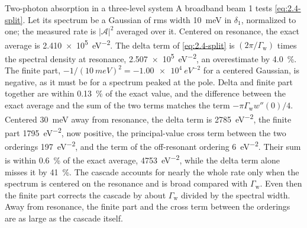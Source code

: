 \begin{workedexample}{Two-photon absorption in a three-level system}
A broadband beam 1 tests \cref{eq:2.4-split}. Let its spectrum be a Gaussian of rms width \SI{10}{meV} in $\delta_1$, normalized to one; the measured rate is $|\mathcal{A}|^2$ averaged over it. Centered on resonance, the exact average is \SI{2.410e5}{eV^{-2}}. The delta term of \cref{eq:2.4-split} is $(2\pi/\varGamma_{\mathrm{w}})$ times the spectral density at resonance, \SI{2.507e5}{eV^{-2}}, an overestimate by \SI{4.0}{\percent}. The finite part, $-1/(\SI{10}{meV})^2 = \SI{-1.00e4}{eV^{-2}}$ for a centered Gaussian, is negative, as it must be for a spectrum peaked at the pole. Delta and finite part together are within \SI{0.13}{\percent} of the exact value, and the difference between the exact average and the sum of the two terms matches the term $-\pi\varGamma_{\mathrm{w}}w''(0)/4$. Centered \SI{30}{meV} away from resonance, the delta term is \SI{2785}{eV^{-2}}, the finite part \SI{+1795}{eV^{-2}}, now positive, the principal-value cross term between the two orderings \SI{197}{eV^{-2}}, and the term of the off-resonant ordering \SI{6}{eV^{-2}}. Their sum is within \SI{0.6}{\percent} of the exact average, \SI{4753}{eV^{-2}}, while the delta term alone misses it by \SI{41}{\percent}. The cascade accounts for nearly the whole rate only when the spectrum is centered on the resonance and is broad compared with $\varGamma_{\mathrm{w}}$. Even then the finite part corrects the cascade by about $\varGamma_{\mathrm{w}}$ divided by the spectral width. Away from resonance, the finite part and the cross term between the orderings are as large as the cascade itself.
\end{workedexample}
